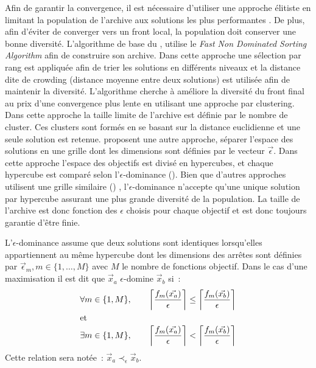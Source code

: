 Afin de garantir la convergence, il est nécessaire d’utiliser une approche élitiste
en limitant la population de l’archive aux solutions les plus performantes \parencite{Zitzler2000173}.
De plus, afin d’éviter de converger vers un front local, la population doit conserver
une bonne diversité.
L’algorithme de base du  \parencite{Deb2002182}, utilise le \textit{Fast
Non Dominated Sorting Algorithm} afin de construire son archive. Dans cette approche une
sélection par rang est appliquée afin de trier les solutions en différents niveaux et la
distance dite de crowding (distance moyenne entre deux solutions) est utilisée afin de
maintenir la diversité. L’algorithme  cherche à améliore la diversité du
front final au prix d’une convergence plus lente en utilisant une approche par clustering.
Dans cette approche la taille limite de l’archive est définie par le nombre de cluster.
Ces clusters sont formés en se basant sur la distance euclidienne et une seule solution
est retenue.
\textcite{Laumanns2002263} proposent une autre approche, séparer l’espace des solutions en une
grille dont les dimensions sont définies par le vecteur $\vec{\epsilon}$. Dans cette
approche l’espace des objectifs est divisé en hypercubes, et chaque hypercube est comparé
selon l’$\epsilon$-dominance (). Bien que d’autres
approches utilisent une grille similaire () \parencite{Knowles2000149},
l’$\epsilon$-dominance n’accepte qu’une unique solution par hypercube assurant une plus
grande diversité de la population. La taille de l’archive est donc fonction des $\epsilon$
choisis pour chaque objectif et est donc toujours garantie d’être finie.


\begin{Def}\label{def:eps_dominance}
L’$\epsilon$-dominance assume que deux solutions sont identiques lorsqu’elles appartiennent
au même hypercube dont les dimensions des arrêtes sont définies par
$\vec{\epsilon}_{m}, m \in \{1, \dotsc, M\}$ avec $M$ le nombre de fonctions objectif.
Dans le cas d’une maximisation il est dit que $\vec{x}_{a}$ $\epsilon$-domine $\vec{x}_{b}$ si~:
\begin{align*}
  \forall m \in \{1, M\}, \qquad
  \left\lceil\frac{f_{m}(\vec{x_{a}})}{\epsilon}\right\rceil &\leq
  \left\lceil\frac{f_{m}(\vec{x_{b}})}{\epsilon}\right\rceil  \\
  \intertext{et}
  \exists m \in \{1, M\}, \qquad
  \left\lceil\frac{f_{m}(\vec{x_{a}})}{\epsilon}\right\rceil &<
  \left\lceil\frac{f_{m}(\vec{x_{b}})}{\epsilon}\right\rceil  \\
\end{align*}
Cette relation sera notée~: $\vec{x}_{a} \prec_{\epsilon} \vec{x}_{b}$.
\end{Def}

